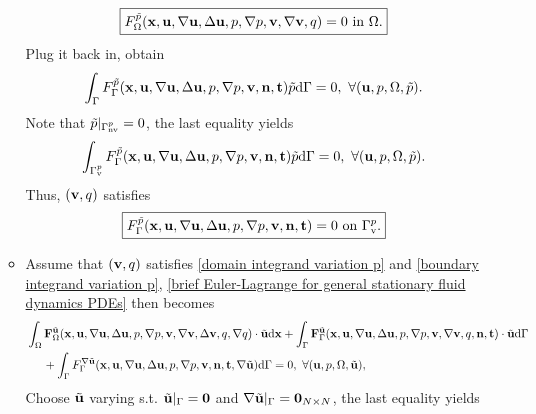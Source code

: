 \documentclass[oneside,11pt]{book}
\numberwithin{equation}{section}
\begin{document}
\begin{itemize}[leftmargin=0in]
\begin{itemize}
\begin{align}
            \label{domain integrand variation p}
            \boxed{F_\Omega^{\tilde{p}}({\bf x},{\bf u},\nabla{\bf u},\Delta{\bf u},p,\nabla p,{\bf v},\nabla{\bf v},q) = 0 \mbox{ in } \Omega.}
        \end{align}
        Plug it back in, obtain
        \begin{align*}
            \int_\Gamma F_\Gamma^{\tilde{p}}({\bf x},{\bf u},\nabla{\bf u},\Delta{\bf u},p,\nabla p,{\bf v},{\bf n},{\bf t})\tilde{p}{\rm d}\Gamma = 0,\ \forall({\bf u},p,\Omega,\tilde{p}).
        \end{align*}
        Note that $\tilde{p}|_{\Gamma_{\rm nv}^p} = 0$, the last equality yields
        \begin{align*}
            \int_{\Gamma_{\rm v}^p} F_\Gamma^{\tilde{p}}({\bf x},{\bf u},\nabla{\bf u},\Delta{\bf u},p,\nabla p,{\bf v},{\bf n},{\bf t})\tilde{p}{\rm d}\Gamma = 0,\ \forall({\bf u},p,\Omega,\tilde{p}).
        \end{align*}
        Thus, $({\bf v},q)$ satisfies
        \begin{align}
            \label{boundary integrand variation p}
            \boxed{F_\Gamma^{\tilde{p}}({\bf x},{\bf u},\nabla{\bf u},\Delta{\bf u},p,\nabla p,{\bf v},{\bf n},{\bf t}) = 0 \mbox{ on } \Gamma_{\rm v}^p.}
        \end{align}
        \item Assume that $({\bf v},q)$ satisfies \eqref{domain integrand variation p} and \eqref{boundary integrand variation p}, \eqref{brief Euler-Lagrange for general stationary fluid dynamics PDEs} then becomes
        \begin{align*}
            &\int_\Omega {\bf F}_\Omega^{\tilde{\bf u}}({\bf x},{\bf u},\nabla{\bf u},\Delta{\bf u},p,\nabla p,{\bf v},\nabla{\bf v},\Delta{\bf v},q,\nabla q)\cdot\tilde{\bf u}{\rm d}{\bf x} + \int_\Gamma {\bf F}_\Gamma^{\tilde{\bf u}}({\bf x},{\bf u},\nabla{\bf u},\Delta{\bf u},p,\nabla p,{\bf v},\nabla{\bf v},q,{\bf n},{\bf t})\cdot\tilde{\bf u}{\rm d}\Gamma\\
            &\hspace{5mm}+ \int_\Gamma F_\Gamma^{\nabla\tilde{\bf u}}({\bf x},{\bf u},\nabla{\bf u},\Delta{\bf u},p,\nabla p,{\bf v},{\bf n},{\bf t},\nabla\tilde{\bf u}){\rm d}\Gamma = 0,\ \forall({\bf u},p,\Omega,\tilde{\bf u}),
        \end{align*}
        Choose $\tilde{\bf u}$ varying s.t. $\tilde{\bf u}|_\Gamma = {\bf 0}$ and $\nabla\tilde{\bf u}|_\Gamma = {\bf 0}_{N\times N}$, the last equality yields
        \begin{align*}

\end{align*}
\end{itemize}
\end{itemize}
\end{document}

